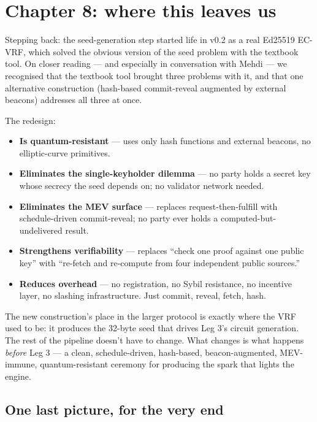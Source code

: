 \documentclass[11pt]{article}
\begin{document}
\section{Chapter 8: where this leaves us}

Stepping back: the seed-generation step started life in v0.2 as a real Ed25519 EC-VRF, which solved the obvious version of the seed problem with the textbook tool. On closer reading --- and especially in conversation with Mehdi --- we recognised that the textbook tool brought three problems with it, and that one alternative construction (hash-based commit-reveal augmented by external beacons) addresses all three at once.

The redesign:

\begin{itemize}[leftmargin=2em, itemsep=2pt]
\item \textbf{Is quantum-resistant} --- uses only hash functions and external beacons, no elliptic-curve primitives.
\item \textbf{Eliminates the single-keyholder dilemma} --- no party holds a secret key whose secrecy the seed depends on; no validator network needed.
\item \textbf{Eliminates the MEV surface} --- replaces request-then-fulfill with schedule-driven commit-reveal; no party ever holds a computed-but-undelivered result.
\item \textbf{Strengthens verifiability} --- replaces ``check one proof against one public key'' with ``re-fetch and re-compute from four independent public sources.''
\item \textbf{Reduces overhead} --- no registration, no Sybil resistance, no incentive layer, no slashing infrastructure. Just commit, reveal, fetch, hash.
\end{itemize}

The new construction's place in the larger protocol is exactly where the VRF used to be: it produces the 32-byte seed that drives Leg 3's circuit generation. The rest of the pipeline doesn't have to change. What changes is what happens \emph{before} Leg 3 --- a clean, schedule-driven, hash-based, beacon-augmented, MEV-immune, quantum-resistant ceremony for producing the spark that lights the engine.

\subsection*{One last picture, for the very end}
\end{document}

